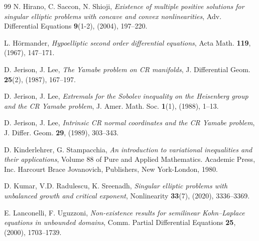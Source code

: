 \documentclass[11pt]{amsart}
\numberwithin{equation}{section} %
\theoremstyle{definition}
\begin{document}
\begin{thebibliography}{99}
	N. Hirano, C. Saccon, N. Shioji,
	{\em Existence of multiple positive solutions for singular elliptic problems with concave and convex nonlinearities},
	Adv. Differential Equations {\bf 9}(1-2), (2004), 197--220.
	
	L. H\"{o}rmander, 
	{\em Hypoelliptic second order differential equations}, 
	Acta Math. {\bf 119}, (1967), 147--171.
	
	D. Jerison, J. Lee, 
	{\em The Yamabe problem on CR manifolds}, 
	J. Differential Geom. {\bf 25}(2), (1987), 167--197.
	
	D. Jerison, J. Lee, 
	{\em Extremals for the Sobolev inequality on the Heisenberg group and the CR Yamabe problem}, 
	J. Amer. Math. Soc. {\bf 1}(1), (1988), 1--13.

D. Jerison, J. Lee, 
{\em Intrinsic CR normal coordinates and the CR Yamabe problem},
J. Differ. Geom. {\bf 29}, (1989), 303--343.
	
	D. Kinderlehrer, G. Stampacchia, 
	{\em An introduction to variational inequalities and their applications}, 
	Volume 88 of Pure and Applied Mathematics. Academic Press,
	Inc. Harcourt Brace Jovanovich, Publishers, New York-London, 1980.	
	
	D. Kumar, V.D. Radulescu, K. Sreenadh,
	{\em Singular elliptic problems with unbalanced growth and critical exponent},
	Nonlinearity {\bf 33}(7), (2020), 3336--3369.
	
	
	
	E. Lanconelli, F. Uguzzoni, 
	{\em Non-existence results for semilinear Kohn–Laplace equations in unbounded domains}, 
	Comm. Partial Differential Equations {\bf 25}, (2000), 1703--1739.
	
	
	

\end{thebibliography}
\end{document}
